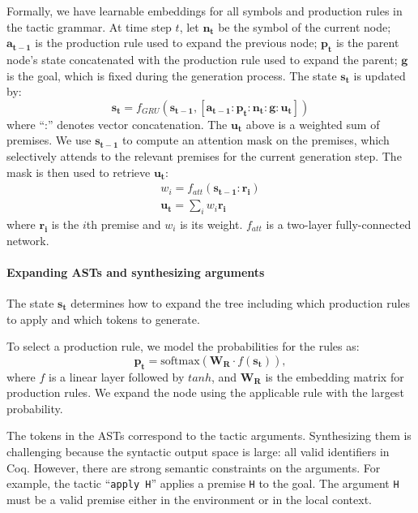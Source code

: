 \documentclass{article}
\newcommand{\smallsec}[1]{\vspace{-3mm} \paragraph{#1}}
\begin{document}
Formally, we have learnable embeddings for all symbols and production rules in the tactic grammar. At time step $t$, let $\mathbf{n_t}$ be the symbol of the current node;
$\mathbf{a_{t-1}}$ is the production rule used to expand the previous node; $\mathbf{p_t}$ is the parent node's state concatenated with the production rule used to expand the parent;
$\mathbf{g}$ is the goal, which is fixed during the generation process.
The state $\mathbf{s_t}$ is updated by:
\begin{equation}
\mathbf{s_t} = f_{GRU}(\mathbf{s_{t-1}}, [\mathbf{a_{t-1}} : \mathbf{p_t} : \mathbf{n_t}: \mathbf{g}  : \mathbf{u_t}])
\end{equation}
where ``:'' denotes vector concatenation. 
The $\mathbf{u_t}$ above is a weighted sum of premises.
We use $\mathbf{s_{t-1}}$ to compute an attention mask on the premises, which selectively attends to the relevant premises for the current generation step.
The mask is then used to retrieve $\mathbf{u_t}$:
\begin{eqnarray}
w_i = f_{att}(\mathbf{s_{t-1}} : \mathbf{r_i}) \\
\label{eqn:att}
\mathbf{u_t} = \sum_{i}{w_i \mathbf{r_i}}
\end{eqnarray}
where $\mathbf{r_i}$ is the $i$th premise and $w_i$ is its weight. 
$f_{att}$ is a two-layer fully-connected network.







\smallsec{Expanding ASTs and synthesizing arguments}
The state $\mathbf{s_t}$ determines how to expand the tree including which production rules to apply and which tokens to generate.

To select a production rule, we model the probabilities for the rules as:
\begin{equation}
\mathbf{p_t} = \mathrm{softmax}(\mathbf{W_R} \cdot f(\mathbf{s_t})),
\label{eqn:prob}
\end{equation}
where $f$ is a linear layer followed by $tanh$, and 
$\mathbf{W_R}$ is the embedding matrix for production rules.
We expand the node using the applicable rule with the largest probability.

The tokens in the ASTs correspond to the tactic arguments.
Synthesizing them is challenging because the syntactic output space is large:
all valid identifiers in Coq.
However, there are strong semantic constraints on the arguments.
For example, the tactic ``\texttt{apply H}'' applies a premise \texttt{H} to the goal.
The argument \texttt{H} must be a valid premise either in the environment or in the local context.
\end{document}
